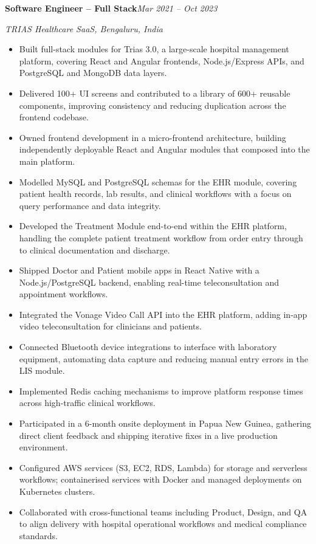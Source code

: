 \documentclass[10pt,letterpaper]{article}
\newcommand{\jobtitle}[2]{%
  \vspace{3pt}%
  \noindent\textbf{#1}\hfill\textit{#2}\par%
}
\newcommand{\companyline}[1]{%
  \noindent\textit{#1}\par%
  \vspace{1pt}%
}
\begin{document}
\jobtitle{Software Engineer -- Full Stack}{Mar 2021 -- Oct 2023}
\companyline{TRIAS Healthcare SaaS, Bengaluru, India}
\begin{itemize}[leftmargin=12pt, label=\textbullet, itemsep=1pt, topsep=0pt, parsep=0pt]
  \item Built full-stack modules for Trias 3.0, a large-scale hospital management platform, covering React and Angular frontends, Node.js/Express APIs, and PostgreSQL and MongoDB data layers.
  \item Delivered 100+ UI screens and contributed to a library of 600+ reusable components, improving consistency and reducing duplication across the frontend codebase.
  \item Owned frontend development in a micro-frontend architecture, building independently deployable React and Angular modules that composed into the main platform.
  \item Modelled MySQL and PostgreSQL schemas for the EHR module, covering patient health records, lab results, and clinical workflows with a focus on query performance and data integrity.
  \item Developed the Treatment Module end-to-end within the EHR platform, handling the complete patient treatment workflow from order entry through to clinical documentation and discharge.
  \item Shipped Doctor and Patient mobile apps in React Native with a Node.js/PostgreSQL backend, enabling real-time teleconsultation and appointment workflows.
  \item Integrated the Vonage Video Call API into the EHR platform, adding in-app video teleconsultation for clinicians and patients.
  \item Connected Bluetooth device integrations to interface with laboratory equipment, automating data capture and reducing manual entry errors in the LIS module.
  \item Implemented Redis caching mechanisms to improve platform response times across high-traffic clinical workflows.
  \item Participated in a 6-month onsite deployment in Papua New Guinea, gathering direct client feedback and shipping iterative fixes in a live production environment.
  \item Configured AWS services (S3, EC2, RDS, Lambda) for storage and serverless workflows; containerised services with Docker and managed deployments on Kubernetes clusters.
  \item Collaborated with cross-functional teams including Product, Design, and QA to align delivery with hospital operational workflows and medical compliance standards.
\end{itemize}
\end{document}
